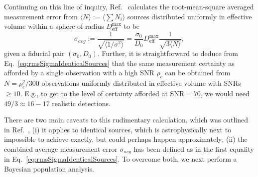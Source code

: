 \documentclass[aps,prd,amsmath,floats,floatfix, twocolumn,
superscriptaddress,nofootinbib,showpacs]{revtex4-1}
\newcommand{\D}{\mathrm{d}}
\newcommand{\deff}{D_\mathrm{eff}}
\begin{document}
Continuing on this line of inquiry, Ref.~\cite{Markakis:2010mp} calculates the 
root-mean-square averaged measurement error from 
$\langle N\rangle:=\langle\sum N_i\rangle$ sources distributed uniformly in
effective volume within a sphere of radius $\deff^\mathrm{max}$ to be
\begin{equation}\label{eq:rmsSigmaIdenticalSources}
 \sigma_{avg} := \frac{1}{\sqrt{\langle1/\sigma^{2}\rangle}} = \frac{\sigma_0}{D_0} \deff^\mathrm{max} \frac{1}{\sqrt{3\langle N\rangle}},
\end{equation}
given a fiducial pair $(\sigma_0, D_0)$.
Further, it is straightforward to deduce from Eq.~\ref{eq:rmsSigmaIdenticalSources}
that the same measurement certainty as afforded by a single
observation with a high SNR $\rho_c$ can be obtained from $N = \rho_c^2/300$ observations
uniformly distributed in effective volume with SNRs $\geq 10$. E.g., to get to the level 
of certainty afforded at SNR$=70$, we would need $49/3\approx 16-17$ realistic detections.

There are two main caveats to this rudimentary calculation, which was outlined in 
Ref.~\cite{Markakis:2010mp}, (i) it applies to identical sources,
which is astrophysically next to impossible to achieve exactly, but could perhaps happen 
approximately; (ii) the combined average measurement error $\sigma_{avg}$ has been defined
as in the first equality in Eq.~\ref{eq:rmsSigmaIdenticalSources}. To overcome both,
we next perform a Bayesian population analysis.
\end{document}
